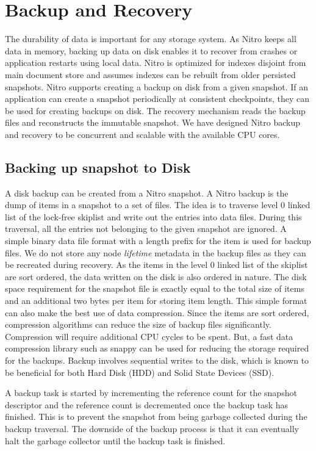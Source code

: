 \documentclass{vldb}
\begin{document}
\section{Backup and Recovery}
The durability of data is important for any storage system. As Nitro keeps all data in memory, backing up data on disk enables it to recover from crashes or application restarts using local data. Nitro is optimized for indexes disjoint from main document store and assumes indexes can be rebuilt from older persisted snapshots. Nitro supports creating a backup on disk from a given snapshot. If an application can create a snapshot periodically at consistent checkpoints, they can be used for creating backups on disk. The recovery mechanism reads the backup files and reconstructs the immutable snapshot. We have designed Nitro backup and recovery to be concurrent and scalable with the available CPU cores.


\subsection{Backing up snapshot to Disk}
A disk backup can be created from a Nitro snapshot. A Nitro backup is the dump of items in a snapshot to a set of files. The idea is to traverse level 0 linked list of the lock-free skiplist and write out the entries into data files. During this traversal, all the entries not belonging to the given snapshot are ignored. A simple binary data file format with a length prefix for the item is used for backup files. We do not store any node \textit{lifetime} metadata in the backup files as they can be recreated during recovery. As the items in the level 0 linked list of the skiplist are sort ordered, the data written on the disk is also ordered in nature. The disk space requirement for the snapshot file is exactly equal to the total size of items and an additional two bytes per item for storing item length. This simple format can also make the best use of data compression. Since the items are sort ordered, compression algorithms can reduce the size of backup files significantly. Compression will require additional CPU cycles to be spent. But, a fast data compression library such as snappy can be used for reducing the storage required for the backups. Backup involves sequential writes to the disk, which is known to be beneficial for both Hard Disk (HDD) and Solid State Devices (SSD).

A backup task is started by incrementing the reference count for the snapshot descriptor and the reference count is decremented once the backup task has finished. This is to prevent the snapshot from being garbage collected during the backup traversal. The downside of the backup process is that it can eventually halt the garbage collector until the backup task is finished.
\end{document}
